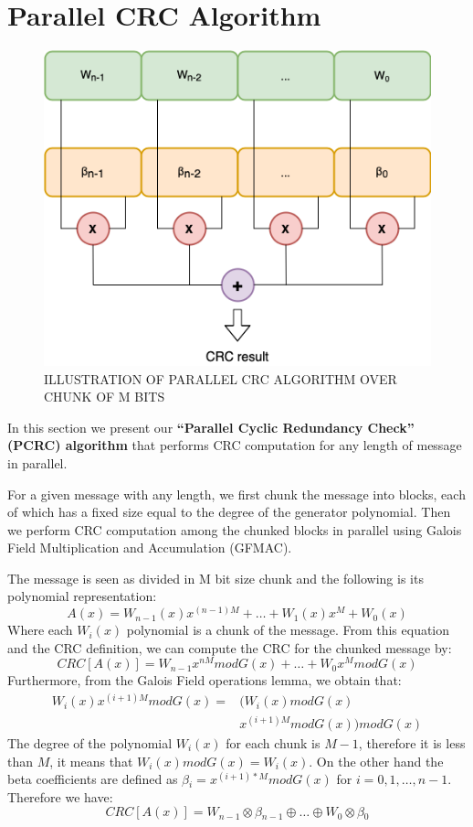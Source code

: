 \documentclass[fleqn]{IEEEtran}
\begin{document}
\section{Parallel CRC Algorithm}
\begin{figure}[bt]
   \centering
   \includegraphics[width=\columnwidth]{figures/PCRC.png}
   \caption{ILLUSTRATION OF  PARALLEL CRC ALGORITHM OVER CHUNK OF M BITS}
   \label{fig:PCRC}
\end{figure}

In this section we present our \textbf{“Parallel Cyclic Redundancy Check” (PCRC) 
algorithm} that performs CRC computation for any length of message in parallel. 

For a given message with any length, we first chunk the message into blocks, 
each of which has a fixed size equal to the degree of the generator polynomial. 
Then we perform CRC computation among the chunked blocks in parallel using 
Galois Field Multiplication and Accumulation (GFMAC).

The message is seen as divided in M bit size chunk and the following is its 
polynomial representation:
\[
   A(x)=W_{n-1}(x)x^{(n-1)M}+\dots{}+W_{1}(x)x^{M}+W_{0}(x)
\]
Where each $W_{i}(x)$ polynomial is a chunk of the message. From this equation 
and the CRC definition, we can compute the CRC for the chunked message by:
\[
   CRC[A(x)]=W_{n-1}x^{nM}modG(x)+\dots{}+W_{0}x^{M}modG(x)
\]
Furthermore, from the Galois Field operations lemma, we obtain that:
\[
\begin{split}
W_{i}(x)x^{(i+1)M}modG(x) = & (W_{i}(x)modG(x) \\& x^{(i+1)M}modG(x))modG(x)
\end{split}
\]
The degree of the polynomial $W_{i}(x)$ for each chunk is $M-1$, therefore it 
is less than $M$, it means that $W_{i}(x)modG(x)=W_{i}(x)$. On the other hand 
the beta coefficients are defined as 
$\beta{}_{i}=x^{(i+1)*M}modG(x)$ for $i=0,1,\dots{},n-1$. Therefore we have:
\[
   CRC[A(x)]=W_{n-1}\otimes{}\beta{}_{n-1}\oplus{}\dots{}
   \oplus{}W_{0}\otimes{}\beta{}_{0}
\]
\end{document}
